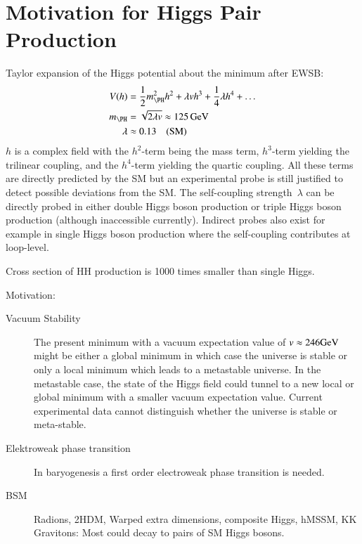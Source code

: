 \section{Motivation for Higgs Pair Production}


Taylor expansion of the Higgs potential about the minimum after EWSB:
\begin{align*}
  V(h) &= \frac{1}{2} m_{\PH}^2 h^2 + \lambda v h^3 + \frac{1}{4} \lambda h^4 + \dots \\
  m_{\PH} &= \sqrt{2 \lambda v} \approx \SI{125}{\GeV} \\
  \lambda &\approx 0.13 \quad \text{(SM)}
\end{align*}
$h$ is a complex field with the $h^2$-term being the mass term,
$h^3$-term yielding the trilinear coupling, and the $h^4$-term
yielding the quartic coupling. All these terms are directly predicted
by the SM but an experimental probe is still justified to detect
possible deviations from the SM. The self-coupling strength~$\lambda$
can be directly probed in either double Higgs boson production or
triple Higgs boson production (although inaccessible
currently). Indirect probes also exist for example in single Higgs
boson production where the self-coupling contributes at loop-level.

Cross section of HH production is 1000 times smaller than single
Higgs. 

Motivation:
\begin{description}

\item[Vacuum Stability] The present minimum with a vacuum expectation
  value of $v \approx \si{246}{\ensuremath{\text{GeV}}}$ might be either a global minimum
  in which case the universe is stable or only a local minimum which
  leads to a metastable universe. In the metastable case, the state of
  the Higgs field could tunnel to a new local or global minimum with a
  smaller vacuum expectation value. Current experimental data cannot
  distinguish whether the universe is stable or
  meta-stable.

\item[Elektroweak phase transition] In baryogenesis a first order
  electroweak phase transition is needed.

\item[BSM] Radions, 2HDM, Warped extra dimensions, composite Higgs,
  hMSSM, KK Gravitons: Most could decay to pairs of SM Higgs bosons.

\end{description}



